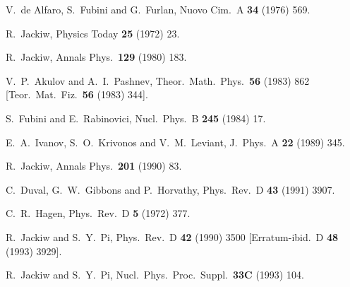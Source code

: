 \documentclass[a4paper,12pt]{article}
\begin{document}
\begin{thebibliography}{99}

V.~de Alfaro, S.~Fubini and G.~Furlan,
Nuovo Cim.\ A {\bf 34} (1976) 569.

R.~Jackiw,
Physics Today {\bf 25} (1972) 23.


R.~Jackiw,
Annals Phys.\  {\bf 129} (1980) 183.

V.~P.~Akulov and A.~I.~Pashnev,
Theor.\ Math.\ Phys.\  {\bf 56} (1983) 862
[Teor.\ Mat.\ Fiz.\  {\bf 56} (1983) 344].

S.~Fubini and E.~Rabinovici,
Nucl.\ Phys.\ B {\bf 245} (1984) 17.

E.~A.~Ivanov, S.~O.~Krivonos and V.~M.~Leviant,
J.\ Phys.\ A {\bf 22} (1989) 345.

R.~Jackiw,
Annals Phys.\  {\bf 201} (1990) 83.

C.~Duval, G.~W.~Gibbons and P.~Horvathy,
Phys.\ Rev.\ D {\bf 43} (1991) 3907.

C.~R.~Hagen,
Phys.\ Rev.\ D {\bf 5} (1972) 377.


R.~Jackiw and S.~Y.~Pi,
Phys.\ Rev.\ D {\bf 42} (1990) 3500
[Erratum-ibid.\ D {\bf 48} (1993) 3929].


R.~Jackiw and S.~Y.~Pi,
Nucl.\ Phys.\ Proc.\ Suppl.\  {\bf 33C} (1993) 104.



\end{thebibliography}
\end{document}
